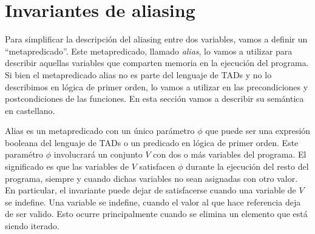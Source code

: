 \documentclass[a4paper,10pt]{article}
\begin{document}
\begin{tad}{}
  \tadAxiomas
\end{tad}

\section{Invariantes de aliasing}

Para simplificar la descripción del aliasing entre dos variables, vamos a definir un ``metapredicado''.  Este metapredicado, llamado \emph{alias}, lo vamos a utilizar para describir aquellas variables que comparten memoria en la ejecución del programa.  Si bien el metapredicado alias no es parte del lenguaje de TADs y no lo describimos en lógica de primer orden, lo vamos a utilizar en las precondiciones y postcondiciones de las funciones.  En esta sección vamos a describir su semántica en castellano.

Alias es un metapredicado con un único parámetro $\phi$ que puede ser una expresión booleana del lenguaje de TADs o un predicado en lógica de primer orden.  Este paramétro $\phi$ involucrará un conjunto $V$ con dos o más variables del programa.  El significado es que las variables de $V$ satisfacen $\phi$ durante la ejecución del resto del programa, siempre y cuando dichas variables no sean asignadas con otro valor.  En particular, el invariante puede dejar de satisfacerse cuando una variable de $V$ se indefine.  Una variable se indefine, cuando el valor al que hace referencia deja de ser valido.  Esto ocurre principalmente cuando se elimina un elemento que está siendo iterado.
\end{document}
